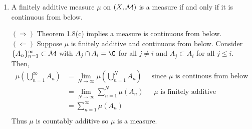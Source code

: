\begin{enumerate}
\begin{pf}
\end{pf}

\item A finitely additive measure $\mu$ on $(X, {\mathcal M})$ is a measure if and only if it is continuous from below.
\begin{pf}
$(\Rightarrow)$ Theorem 1.8(c) implies a measure is continuous from below. 
\\
$(\Leftarrow)$ Suppose $\mu$ is finitely additive and continuous from below. Consider $\{A_n\}_{n=1}^\infty\subset {\mathcal M}$ with $A_j\cap A_i=\O$ for all $j\neq i$ and $A_j \subset A_{i}$ for all $j\leq i$. Then,
\[
\begin{array}{lll}
\mu\left( \bigcup_{n=1}^\infty A_n \right)& = \lim_{N\rightarrow \infty}\mu\left( \bigcup_{n=1}^N A_n \right)& \text{ since $\mu$ is continous from below}\\
 &=	\lim_{N\rightarrow \infty} \sum_{n=1}^N\mu\left(A_n \right)& \text{ $\mu$ is finitely additive}\\
 & = \sum_{n=1}^\infty \mu(A_n)& \\
\end{array}
\]  
Thus $\mu$ is countably additive so $\mu$ is a measure. 	
\end{pf}


\end{enumerate}

